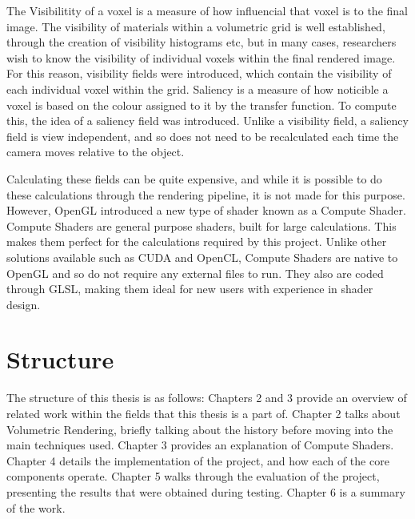 The Visibilitity of a voxel is a measure of how influencial that voxel is to the final image. The visibility of materials within a volumetric grid is well established, through the creation of visibility histograms etc, but in many cases, researchers wish to know the visibility of individual voxels within the final rendered image. For this reason, visibility fields were introduced, which contain the visibility of each individual voxel within the grid. Saliency is a measure of how noticible a voxel is based on the colour assigned to it by the transfer function. To compute this, the idea of a saliency field was introduced. Unlike a visibility field, a saliency field is view independent, and so does not need to be recalculated each time the camera moves relative to the object.

Calculating these fields can be quite expensive, and while it is possible to do these calculations through the rendering pipeline, it is not made for this purpose. However, OpenGL introduced a new type of shader known as a Compute Shader. Compute Shaders are general purpose shaders, built for large calculations. This makes them perfect for the calculations required by this project. Unlike other solutions available such as CUDA and OpenCL, Compute Shaders are native to OpenGL and so do not require any external files to run. They also are coded through GLSL, making them ideal for new users with experience in shader design.

\section{Structure}

The structure of this thesis is as follows: Chapters 2 and 3 provide an overview of related work within the fields that this thesis is a part of. Chapter 2 talks about Volumetric Rendering, briefly talking about the history before moving into the main techniques used. Chapter 3 provides an explanation of Compute Shaders. Chapter 4 details the implementation of the project, and how each of the core components operate. Chapter 5 walks through the evaluation of the project, presenting the results that were obtained during testing. Chapter 6 is a summary of the work. 

